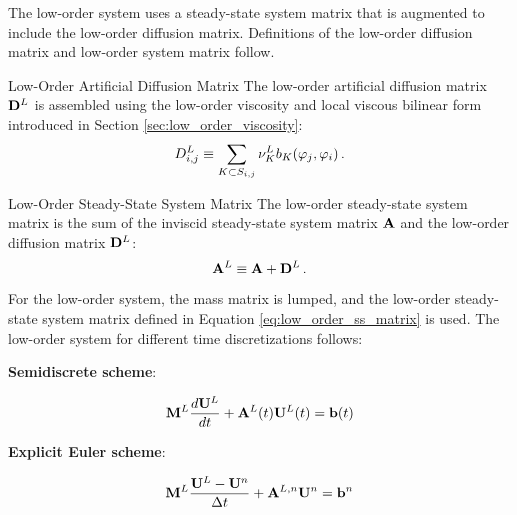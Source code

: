 The low-order system uses a steady-state system matrix that is augmented
to include the low-order diffusion matrix. Definitions of the low-order
diffusion matrix and low-order system matrix follow.
\begin{definition}{Low-Order Artificial Diffusion Matrix}
   The low-order artificial diffusion matrix $\loworderdiffusionmatrix$
   is assembled using the low-order viscosity and local viscous bilinear
   form introduced in Section \ref{sec:low_order_viscosity}:
   \begin{equation}\label{eq:low_order_diffusion_matrix}
     \diffusionmatrixletter\ij^L \equiv \sumKSij\lowordercellviscosity
     \localviscbilinearform{\cell}{j}{i} \eqp
   \end{equation}
\end{definition}
\begin{definition}{Low-Order Steady-State System Matrix}
   The low-order steady-state system matrix is the sum of the inviscid 
   steady-state system matrix $\ssmatrix$ and the low-order diffusion
   matrix $\loworderdiffusionmatrix$:
   \begin{equation}\label{eq:low_order_ss_matrix}
      \loworderssmatrix \equiv \ssmatrix + \loworderdiffusionmatrix \eqp
   \end{equation}
\end{definition}
For the low-order system, the mass matrix is lumped, and the low-order
steady-state system matrix defined in Equation \eqref{eq:low_order_ss_matrix}
is used. The low-order system for different time discretizations follows:
\begin{center}{\textbf{Semidiscrete scheme}:}\end{center}
\begin{equation}\label{eq:low_semidiscrete}
   \lumpedmassmatrix\ddt{\lowordersolution}
    + \loworderssmatrix(\timevalue)\lowordersolution(\timevalue) 
    = \ssrhs(\timevalue)
\end{equation}
\begin{center}{\textbf{Explicit Euler scheme}:}\end{center}
\begin{equation}\label{eq:low_FE}
  \lumpedmassmatrix\frac{\lowordersolution-\solutionvector^{\timeindex}}
  {\timestepsize}
  + \loworderssmatrix[\timeindex]\solutionvector^{\timeindex}
  = \ssrhs^\timeindex
\end{equation}
